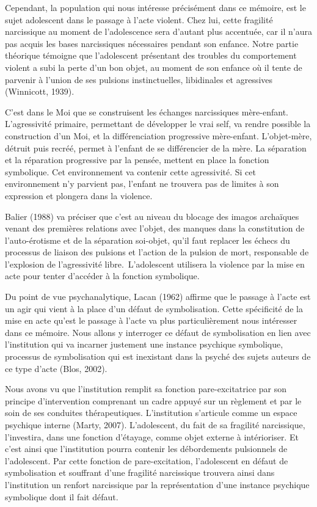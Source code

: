 \documentclass[12pt, a4paper]{book}
\begin{document}
\begin{spacing}{1.5}
Cependant, la population qui nous intéresse précisément dans ce mémoire, est le sujet adolescent dans le passage à l'acte violent. Chez lui, cette fragilité narcissique au moment de l'adolescence sera d'autant plus accentuée, car il n'aura pas acquis les bases narcissiques nécessaires pendant son enfance. Notre partie théorique témoigne que l'adolescent présentant des troubles du comportement violent a subi la perte d'un bon objet, au moment de son enfance où il tente de parvenir à l'union de ses pulsions instinctuelles, libidinales et agressives (Winnicott, 1939). 

C'est dans le Moi que se construisent les échanges narcissiques mère-enfant. L'agressivité primaire, permettant de développer le vrai self, va rendre possible la construction d'un Moi, et la différenciation progressive mère-enfant. L'objet-mère, détruit puis recréé, permet à l'enfant de se différencier de la mère. La séparation et la réparation progressive par la pensée, mettent en place la fonction symbolique. Cet environnement va contenir cette agressivité. Si cet environnement n'y parvient pas, l'enfant ne trouvera pas de limites à son expression et plongera dans la violence. 

Balier (1988) va préciser que c'est au niveau du blocage des imagos archaïques venant des premières relations avec l'objet, des manques dans la constitution de l'auto-érotisme et de la séparation soi-objet, qu'il faut replacer les échecs du processus de liaison des pulsions et l'action de la pulsion de mort, responsable de l'explosion de l'agressivité libre. L'adolescent utilisera la violence par la mise en acte pour tenter d'accéder à la fonction symbolique.

Du point de vue psychanalytique, Lacan (1962) affirme que le passage à l'acte est un agir qui vient à la place d'un défaut de symbolisation. Cette spécificité de la mise en acte qu'est le passage à l'acte va plus particulièrement nous intéresser dans ce mémoire. Nous allons y interroger ce défaut de symbolisation en lien avec l'institution  qui va incarner justement une instance psychique symbolique, processus de symbolisation qui est inexistant dans la psyché des sujets auteurs de ce type d'acte (Blos, 2002).

Nous avons vu que l'institution remplit sa fonction pare-excitatrice par son principe d'intervention comprenant un cadre appuyé sur un règlement et par le soin de ses conduites thérapeutiques. L'institution s'articule comme un espace psychique interne (Marty, 2007). L'adolescent, du fait de sa fragilité narcissique, l'investira, dans une fonction d'étayage, comme objet externe à intérioriser. Et c'est ainsi que l'institution pourra contenir les débordements pulsionnels de l'adolescent. Par cette fonction de pare-excitation, l'adolescent en défaut de symbolisation et souffrant d'une fragilité narcissique trouvera ainsi dans l'institution un renfort narcissique par la représentation d'une instance psychique symbolique dont il fait défaut. 


\end{spacing}
\end{document}
